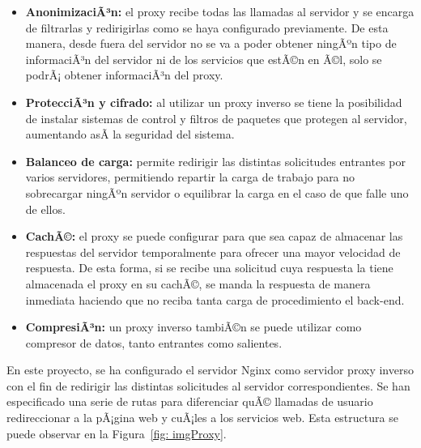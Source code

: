 \begin{itemize}
	
	\item \textbf{AnonimizaciÃ³n:} el proxy recibe todas las llamadas al servidor y se encarga de filtrarlas y redirigirlas como se haya configurado previamente. De esta manera, desde fuera del servidor no se va a poder obtener ningÃºn tipo de informaciÃ³n del servidor ni de los servicios que estÃ©n en Ã©l, solo se podrÃ¡ obtener informaciÃ³n del proxy.
	
	\item \textbf{ProtecciÃ³n y cifrado:} al utilizar un proxy inverso se tiene la posibilidad de instalar sistemas de control y filtros de paquetes que protegen al servidor, aumentando asÃ­ la seguridad del sistema.
	
	\item \textbf{Balanceo de carga:} permite redirigir las distintas solicitudes entrantes por varios servidores, permitiendo repartir la carga de trabajo para no sobrecargar ningÃºn servidor o equilibrar la carga en el caso de que falle uno de ellos.
	
	\item \textbf{CachÃ©:} el proxy se puede configurar para que sea capaz de almacenar las respuestas del servidor temporalmente para ofrecer una mayor velocidad de respuesta. De esta forma, si se recibe una solicitud cuya respuesta la tiene almacenada el proxy en su cachÃ©, se manda la respuesta de manera inmediata haciendo que no reciba tanta carga de procedimiento el back-end.
	
	\item \textbf{CompresiÃ³n:} un proxy inverso tambiÃ©n se puede utilizar como compresor de datos, tanto entrantes como salientes.
	
\end{itemize}

En este proyecto, se ha configurado el servidor Nginx como servidor proxy inverso con el fin de redirigir las distintas solicitudes al servidor correspondientes. Se han especificado una serie de rutas para diferenciar quÃ© llamadas de usuario redireccionar a la pÃ¡gina web y cuÃ¡les a los servicios web. Esta estructura se puede observar en la Figura~\ref {fig: imgProxy}.



